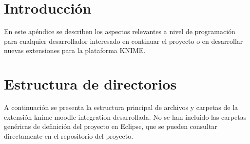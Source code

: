 
\section{Introducción}

En este apéndice se describen los aspectos relevantes a nivel de programación para cualquier 
desarrollador interesado en continuar el proyecto o en desarrollar nuevas extensiones para la 
plataforma KNIME. 
\

\section{Estructura de directorios}

A continuación se presenta la estructura principal de archivos y carpetas de la extensión 
knime-moodle-integration desarrollada. No se han incluido las carpetas genéricas de definición 
del proyecto en Eclipse, que se pueden consultar directamente en el repositorio del proyecto. 

